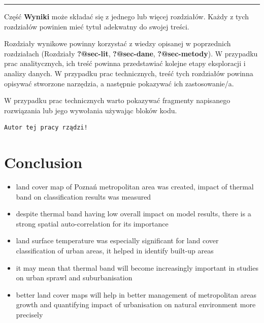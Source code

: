 \documentclass{amuthesis}
\begin{document}
\begin{center}\rule{0.5\linewidth}{0.5pt}\end{center}

Część \textbf{Wyniki} może składać się z jednego lub więcej rozdziałów.
Każdy z tych rozdziałów powinien mieć tytuł adekwatny do swojej treści.

Rozdziały wynikowe powinny korzystać z wiedzy opisanej w poprzednich
rozdziałach (Rozdziały \textbf{?@sec-lit}, \textbf{?@sec-dane},
\textbf{?@sec-metody}). W przypadku prac analitycznych, ich treść
powinna przedstawiać kolejne etapy eksploracji i analizy danych. W
przypadku prac technicznych, treść tych rozdziałów powinna opisywać
stworzone narzędzia, a następnie pokazywać ich zastosowanie/a.

W przypadku prac technicznych warto pokazywać fragmenty napisanego
rozwiązania lub jego wywołania używając bloków kodu.

\begin{Shaded}
\begin{Highlighting}[]
\OtherTok{=} 
  \NormalTok{)}
\NormalTok{\}}
\NormalTok{(}\NormalTok{)}
\end{Highlighting}
\end{Shaded}

\begin{verbatim}
Autor tej pracy rządzi!
\end{verbatim}


\hypertarget{conclusion}{%
\chapter{Conclusion}\label{conclusion}}

\begin{itemize}
\item
  land cover map of Poznań metropolitan area was created, impact of
  thermal band on classification results was measured
\item
  despite thermal band having low overall impact on model results, there
  is a strong spatial auto-correlation for its importance
\item
  land surface temperature was especially significant for land cover
  classification of urban areas, it helped in identify built-up areas
\item
  it may mean that thermal band will become increasingly important in
  studies on urban sprawl and suburbanisation
\item
  better land cover maps will help in better management of metropolitan
  areas growth and quantifying impact of urbanisation on natural
  environment more precisely
\end{itemize}
\end{document}
